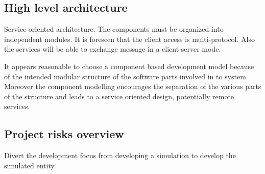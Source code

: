 \subsection{High level architecture}
Service oriented architecture. The components must be organized into independent
modules. It is foreseen that the client access is multi-protocol. Also the
services will be able to exchange message in a client-server mode.

It appears reasonable to choose a component based development model because
of the intended modular structure of the software parts involved in to system.
Moreover the component modelling encourages the separation of the various parts
of the structure and leads to a service oriented design, potentially remote
services.

\subsection{Project risks overview}
Divert the development focus from developing a simulation to develop the
simulated entity.
